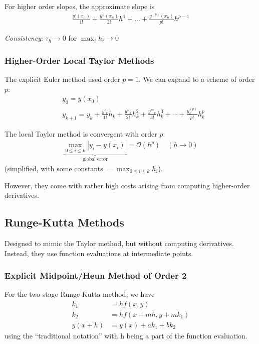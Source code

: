 For higher order slopes, the {\color{blue}approximate slope} is
\begin{align*}
    \frac{y'(x_n)}{1!}+\frac{y''(x_n)}{2!}h^1+\ldots+\frac{y^{(p)}(x_n)}{p!}h^{p-1}
\end{align*}

\emph{Consistency}: $\tau_h\to0$ for $\max_i h_i\to 0$

\subsubsection{Higher-Order Local Taylor Methods}

The explicit Euler method used order $p=1$.
We can expand to a scheme of order $p$:
\begin{align*}
    & y_0=y(x_0) \\
    & y_{k+1}=y_{k}+{\frac{y'_{k}}{1!}}h_{k}+{\frac{y''_k}{2!}}h_{k}^{2}+
    \frac{y'''_k}{3!}h_{k}^{3}+\cdots+{\frac{y_k^{(p)}}{p!}}h_{k}^{p}
\end{align*}

The local Taylor method is convergent with order $p$:
\begin{align*}
    \underbrace{\max_{0\leq i\leq k}|y_i-y(x_i)|}_\text{global error}=\mathcal{O}(h^p)\quad(h\to0)
\end{align*}
(simplified, with some constants $=\max_{0\leq i\leq k}h_i$).

However, they come with rather high costs arising from computing higher-order derivatives.

\subsection{Runge-Kutta Methods}

Designed to mimic the Taylor method, but without computing derivatives.
Instead, they use function evaluations at intermediate points.

\subsubsection{Explicit Midpoint/Heun Method of Order 2}

For the two-stage Runge-Kutta method, we have
\begin{align*}
    k_1 & = hf(x,y) \\
    k_2 & = hf(x+mh, y+mk_1) \\
    y(x+h) & = y(x) + ak_1 + bk_2
\end{align*}
using the ``traditional notation'' with h being a part of the function evaluation.

